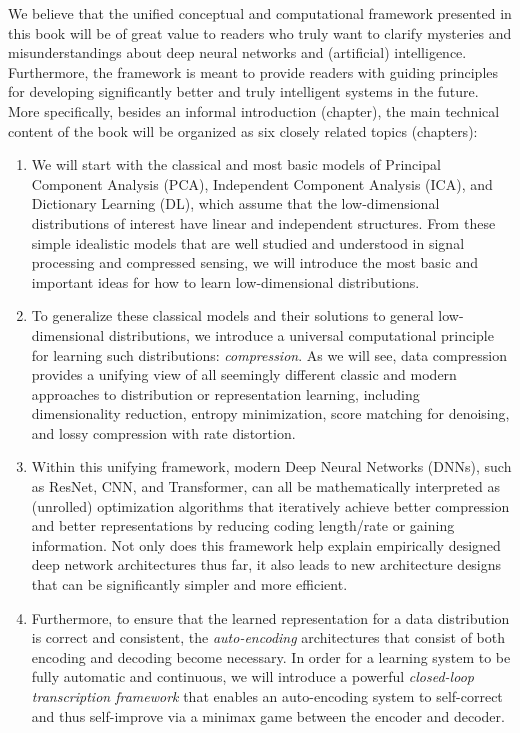 \documentclass[../../book-main.tex]{subfiles}
\begin{document}
We believe that the unified conceptual and computational framework presented in this book will be of great value to readers who truly want to clarify mysteries and misunderstandings about deep neural networks and (artificial) intelligence. Furthermore, the framework is meant to provide readers with guiding principles for developing significantly better and truly intelligent systems in the future. More specifically, besides an informal introduction (chapter), the main technical content of the book will be organized as six closely related topics (chapters):
\begin{enumerate}
\item We will start with the classical and most basic models of Principal Component Analysis (PCA), Independent Component Analysis (ICA), and Dictionary Learning (DL), which assume that the low-dimensional distributions of interest have linear and independent structures. From these simple idealistic models that are well studied and understood in signal processing and compressed sensing, we will introduce the most basic and important ideas for how to learn low-dimensional distributions.

\item To generalize these classical models and their solutions to general low-dimensional distributions, we introduce a universal computational principle for learning such distributions: {\em compression}. As we will see, data compression provides a unifying view of all seemingly different classic and modern approaches to distribution or representation learning, including dimensionality reduction, entropy minimization, score matching for denoising, and lossy compression with rate distortion. 

\item Within this unifying framework, modern Deep Neural Networks (DNNs), such as ResNet, CNN, and Transformer, can all be mathematically interpreted as (unrolled) optimization algorithms that iteratively achieve better compression and better representations by reducing coding length/rate or gaining information. Not only does this framework help explain empirically designed deep network architectures thus far, it also leads to new architecture designs that can be significantly simpler and more efficient.

\item Furthermore, to ensure that the learned representation for a data distribution is correct and consistent, the {\em auto-encoding} architectures that consist of both encoding and decoding become necessary. In order for a learning system to be fully automatic and continuous, we will introduce a powerful {\em closed-loop transcription framework} that enables an auto-encoding system to self-correct and thus self-improve via a minimax game between the encoder and decoder.  


\end{enumerate}
\end{document}
